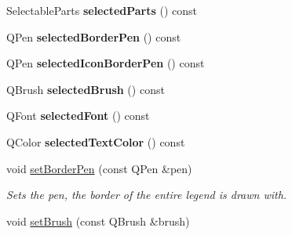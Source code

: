 \begin{DoxyCompactItemize}
\item 
\hypertarget{classQCPLegend_abbbf1b2d6a149013527ed87b0780894a}{}Selectable\+Parts {\bfseries selected\+Parts} () const \label{classQCPLegend_abbbf1b2d6a149013527ed87b0780894a}

\item 
\hypertarget{classQCPLegend_a63156bc4ce64431bada7415cfa2b4dd1}{}Q\+Pen {\bfseries selected\+Border\+Pen} () const \label{classQCPLegend_a63156bc4ce64431bada7415cfa2b4dd1}

\item 
\hypertarget{classQCPLegend_a165630cad7e41f89b54f65cdef3310e8}{}Q\+Pen {\bfseries selected\+Icon\+Border\+Pen} () const \label{classQCPLegend_a165630cad7e41f89b54f65cdef3310e8}

\item 
\hypertarget{classQCPLegend_a600dde0d207ddc6f5a603767360cceac}{}Q\+Brush {\bfseries selected\+Brush} () const \label{classQCPLegend_a600dde0d207ddc6f5a603767360cceac}

\item 
\hypertarget{classQCPLegend_a4c1b08fc0afacb4ffd54f6a49737fa77}{}Q\+Font {\bfseries selected\+Font} () const \label{classQCPLegend_a4c1b08fc0afacb4ffd54f6a49737fa77}

\item 
\hypertarget{classQCPLegend_a08005f3c17728c2c4e23b8ffc0842ffb}{}Q\+Color {\bfseries selected\+Text\+Color} () const \label{classQCPLegend_a08005f3c17728c2c4e23b8ffc0842ffb}

\item 
\hypertarget{classQCPLegend_a866a9e3f5267de7430a6c7f26a61db9f}{}void \hyperlink{classQCPLegend_a866a9e3f5267de7430a6c7f26a61db9f}{set\+Border\+Pen} (const Q\+Pen \&pen)\label{classQCPLegend_a866a9e3f5267de7430a6c7f26a61db9f}

\begin{DoxyCompactList}\small\item\em Sets the pen, the border of the entire legend is drawn with. \end{DoxyCompactList}\item 
\hypertarget{classQCPLegend_a497bbcd38baa3598c08e2b3f48103f23}{}void \hyperlink{classQCPLegend_a497bbcd38baa3598c08e2b3f48103f23}{set\+Brush} (const Q\+Brush \&brush)\label{classQCPLegend_a497bbcd38baa3598c08e2b3f48103f23}


\end{DoxyCompactItemize}
